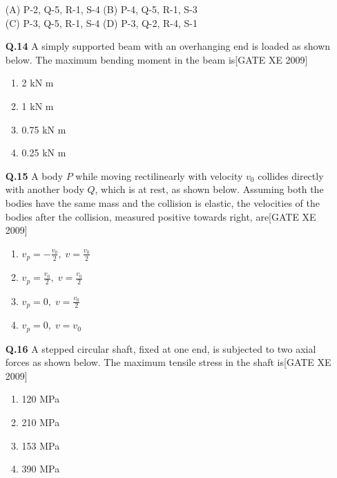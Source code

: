 \documentclass[journal,12pt,onecolumn]{IEEEtran}
\theoremstyle{remark}
\begin{document}
\begin{enumerate}
\vspace{1em}

\noindent
(A) P-2, Q-5, R-1, S-4 \hfill
(B) P-4, Q-5, R-1, S-3 \\
(C) P-3, Q-5, R-1, S-4 \hfill
(D) P-3, Q-2, R-4, S-1

\setcounter{enumi}{13} 

\item[\textbf{Q.14}] A simply supported beam with an overhanging end is loaded as shown below. The maximum bending moment in the beam is\hfill[GATE XE 2009]

\begin{multicols}{2}
\begin{enumerate}
    \item 2 kN m
    \item 1 kN m
    \item 0.75 kN m
    \item 0.25 kN m
\end{enumerate}
\end{multicols}

\vspace{0.3cm}

\item[\textbf{Q.15}] A body $ P $ while moving rectilinearly with velocity $ v_0 $ collides directly with another body $ Q $, which is at rest, as shown below. Assuming both the bodies have the same mass and the collision is elastic, the velocities of the bodies after the collision, measured positive towards right, are\hfill[GATE XE 2009]

\begin{multicols}{2}
\begin{enumerate}
    \item $v_p = -\frac{v_0}{2},\; v = \frac{v_0}{2}$
    \item $v_p = \frac{v_0}{2},\; v = \frac{v_0}{2}$
    \item $v_p = 0,\; v = \frac{v_0}{2}$
    \item $v_p = 0,\; v = v_0$
\end{enumerate}
\end{multicols}

\vspace{0.3cm}

\item[\textbf{Q.16}] A stepped circular shaft, fixed at one end, is subjected to two axial forces as shown below. The maximum tensile stress in the shaft is\hfill[GATE XE 2009]

\begin{multicols}{2}
\begin{enumerate}
    \item 120 MPa
    \item 210 MPa
    \item 153 MPa
    \item 390 MPa
\end{enumerate}
\end{multicols}


\end{enumerate}
\end{document}
